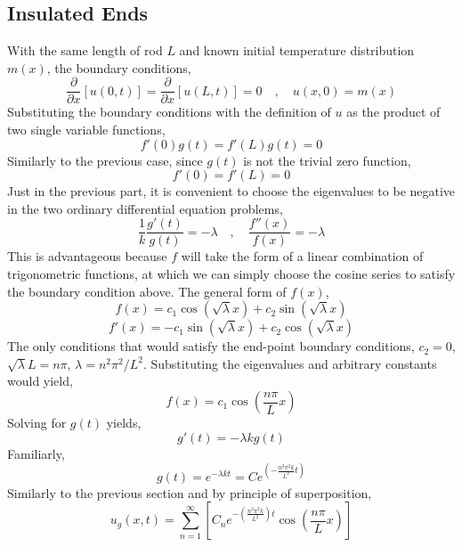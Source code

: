 \documentclass[a4paper, 12pt]{report}
\def\la{\lambda}
\def\f{\frac}
\def\l{\left}
\def\r{\right}
\def\dst{\displaystyle}
\def\p{\partial}
\begin{document}
\begin{center}
\subsection{Insulated Ends}
With the same length of rod $L$ and known initial temperature distribution $m(x)$, the boundary conditions,
$$\f{\p}{\p x}\l[u(0,t)\r] = \f{\p}{\p x}\l[u(L,t)\r] = 0\quad,\quad u(x,0) = m(x)$$
Substituting the boundary conditions with the definition of $u$ as the product of two single variable functions,
$$f'(0)g(t) = f'(L)g(t) = 0$$
Similarly to the previous case, since $g(t)$ is not the trivial zero function,
$$f'(0) = f'(L) = 0$$
Just in the previous part, it is convenient to choose the eigenvalues to be negative in the two ordinary differential equation problems,
$$\f{1}{k}\f{g'(t)}{g(t)} = -\lambda \quad,\quad \f{f''(x)}{f(x)} = -\lambda$$
This is advantageous because $f$ will take the form of a linear combination of trigonometric functions, at which we can simply choose the cosine series to satisfy the boundary condition above. The general form of $f(x)$,
$$f(x) = c_1\cos\l(\sqrt{\la}x\r) + c_2\sin\l(\sqrt{\la}x\r)$$
$$f'(x) = -c_1\sin\l(\sqrt{\la}x\r) + c_2\cos\l(\sqrt{\la}x\r)$$
The only conditions that would satisfy the end-point boundary conditions, $c_2 = 0$, $\sqrt{\la}L = n\pi$, $\la = n^2\pi^2/L^2$. Substituting the eigenvalues and arbitrary constants would yield,
$$f(x) = c_1\cos\l(\f{n\pi}{L}x\r)$$
Solving for $g(t)$ yields,
$$g'(t) = -\la k g(t)$$
Familiarly,
$$g(t) =  e^{-\la k t} = Ce^{\dst{\l(-\f{n^2\pi^2k}{L^2} t\r)}}$$
Similarly to the previous section and by principle of superposition,
$$u_g(x,t) = \sum^{\infty}_{n=1}\l[C_ne^{\dst{-\l(\f{n^2\pi^2k}{L^2}\r)t}}\cos\l(\f{n\pi}{L} x\r)\r]$$

\end{center}
\end{document}
